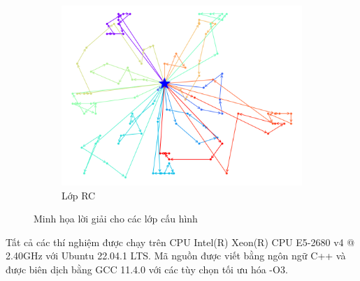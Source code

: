 \begin{figure}[H]
\begin{subfigure}{.3\textwidth}
		\includegraphics[width=1\linewidth]{figures/routes_rc101.png}
		\caption{Lớp RC}
		\label{fig:route_rc}
	\end{subfigure}
	\caption{Minh họa lời giải cho các lớp cấu hình}
\end{figure}

Tất cả các thí nghiệm được chạy trên CPU Intel(R) Xeon(R) CPU E5-2680 v4 @ 2.40GHz với Ubuntu 22.04.1 LTS. Mã nguồn được viết bằng ngôn ngữ C++ và được biên dịch bằng GCC 11.4.0 với các tùy chọn tối ưu hóa -O3.


